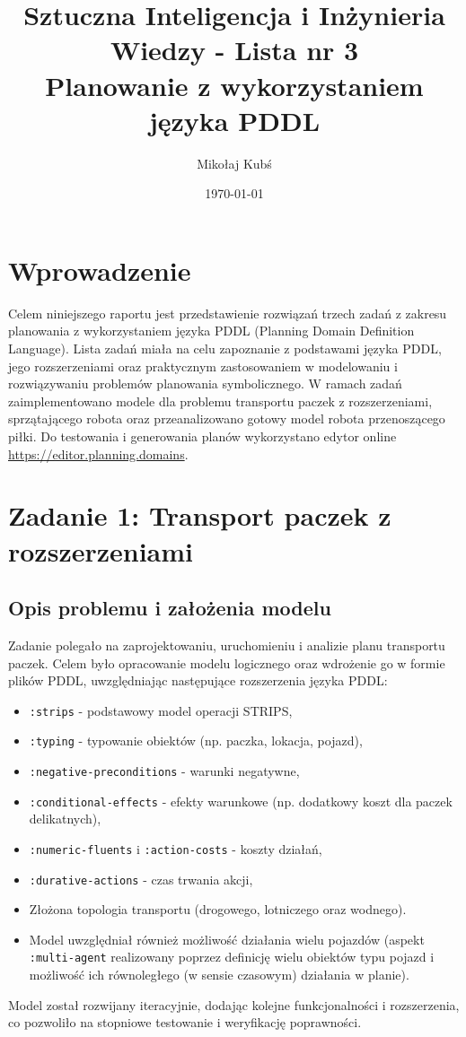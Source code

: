 \documentclass[11pt,a4paper]{article}
\title{
    Sztuczna Inteligencja i Inżynieria Wiedzy - Lista nr 3 \\
    \vspace{0.5cm}
    \textbf{Planowanie z wykorzystaniem języka PDDL}
}
\author{Mikołaj Kubś}
\date{\today}
\begin{document}
\maketitle
\thispagestyle{empty}
\newpage

\tableofcontents
\newpage

\section{Wprowadzenie}
Celem niniejszego raportu jest przedstawienie rozwiązań trzech zadań z zakresu planowania z wykorzystaniem języka PDDL (Planning Domain Definition Language). Lista zadań miała na celu zapoznanie z podstawami języka PDDL, jego rozszerzeniami oraz praktycznym zastosowaniem w modelowaniu i rozwiązywaniu problemów planowania symbolicznego. W ramach zadań zaimplementowano modele dla problemu transportu paczek z rozszerzeniami, sprzątającego robota oraz przeanalizowano gotowy model robota przenoszącego piłki. Do testowania i generowania planów wykorzystano edytor online \url{https://editor.planning.domains}.

\section{Zadanie 1: Transport paczek z rozszerzeniami}
\subsection{Opis problemu i założenia modelu}
Zadanie polegało na zaprojektowaniu, uruchomieniu i analizie planu transportu paczek. Celem było opracowanie modelu logicznego oraz wdrożenie go w formie plików PDDL, uwzględniając następujące rozszerzenia języka PDDL:
\begin{itemize}
  \item \texttt{:strips} - podstawowy model operacji STRIPS,
  \item \texttt{:typing} - typowanie obiektów (np. paczka, lokacja, pojazd),
  \item \texttt{:negative-preconditions} - warunki negatywne,
  \item \texttt{:conditional-effects} - efekty warunkowe (np. dodatkowy koszt dla paczek delikatnych),
  \item \texttt{:numeric-fluents} i \texttt{:action-costs} - koszty działań,
  \item \texttt{:durative-actions} - czas trwania akcji,
  \item Złożona topologia transportu (drogowego, lotniczego oraz wodnego).
  \item Model uwzględniał również możliwość działania wielu pojazdów (aspekt \texttt{:multi-agent} realizowany poprzez definicję wielu obiektów typu pojazd i możliwość ich równoległego (w sensie czasowym) działania w planie).
\end{itemize}
Model został rozwijany iteracyjnie, dodając kolejne funkcjonalności i rozszerzenia, co pozwoliło na stopniowe testowanie i weryfikację poprawności.
\end{document}
